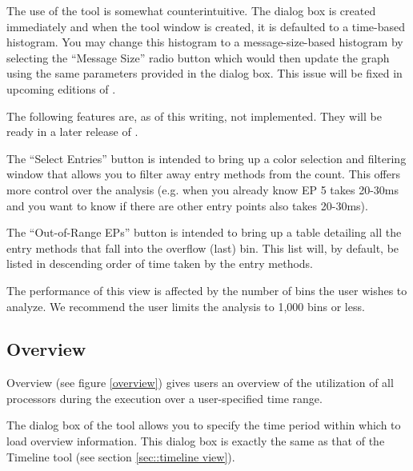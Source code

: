 \documentclass[10pt]{report}
\begin{document}
The use of the tool is somewhat counterintuitive. The dialog box is
created immediately and when the tool window is created, it is
defaulted to a time-based histogram. You may change this histogram to
a message-size-based histogram by selecting the ``Message Size'' radio
button which would then update the graph using the same parameters
provided in the dialog box. This issue will be fixed in upcoming
editions of \projections{}.

The following features are, as of this writing, not implemented. They
will be ready in a later release of \projections{}.

The ``Select Entries'' button is intended to bring up a color
selection and filtering window that allows you to filter away entry
methods from the count. This offers more control over the analysis
(e.g. when you already know EP 5 takes 20-30ms and you want to know if
there are other entry points also takes 20-30ms).

The ``Out-of-Range EPs'' button is intended to bring up a table
detailing all the entry methods that fall into the overflow (last)
bin. This list will, by default, be listed in descending order of time
taken by the entry methods.

The performance of this view is affected by the number of bins the
user wishes to analyze. We recommend the user limits the analysis to
1,000 bins or less.

\subsection{Overview}

Overview (see figure \ref{overview}) gives users an overview of the
utilization of all processors during the execution over a
user-specified time range.

The dialog box of the tool allows you to specify the time period
within which to load overview information. This dialog box is exactly
the same as that of the Timeline tool (see section \ref{sec::timeline
view}).
\end{document}
